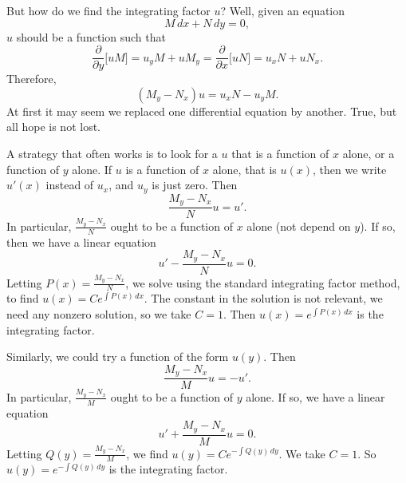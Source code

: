 But how do we find the integrating factor $u$?  Well, given an equation
\begin{equation*}
M \, dx + N \, dy = 0 ,
\end{equation*}
$u$ should be a
function such that
\begin{equation*}
\frac{\partial}{\partial y} \bigl[ u M \bigr] = 
u_y M + u M_y = 
\frac{\partial}{\partial x} \bigl[ u N \bigr] = 
u_x N + u N_x .
\end{equation*}
Therefore,
\begin{equation*}
(M_y-N_x)u = u_x N - u_y M .
\end{equation*}
At first it may seem we replaced one differential equation by another.
True, but all hope is not lost.

A strategy that often works is to look for a $u$ that is a function
of $x$ alone, or a function of $y$ alone.  If $u$ is a function of $x$
alone,
that is $u(x)$, then we write $u'(x)$ instead of $u_x$, and $u_y$ is just
zero.
Then
\begin{equation*}
\frac{M_y-N_x}{N}u = u' .
\end{equation*}
In particular, $\frac{M_y-N_x}{N}$ ought to be a function of $x$ alone (not
depend on $y$).  If so, then we have a linear equation
\begin{equation*}
u' - \frac{M_y-N_x}{N} u = 0 .
\end{equation*}
Letting $P(x) = \frac{M_y-N_x}{N}$,
we solve using the standard integrating factor method,
to find $u(x) = C e^{\int P(x) \, dx}$.  The constant in the
solution is not relevant, we need any nonzero solution,
so we take $C=1$.
Then $u(x) = e^{\int P(x) \, dx}$ is the integrating factor.

Similarly, we could try a function of the form $u(y)$.
Then
\begin{equation*}
\frac{M_y-N_x}{M} u = - u' .
\end{equation*}
In particular, $\frac{M_y-N_x}{M}$ ought to be a function of $y$ alone.
If so, we have a linear equation
\begin{equation*}
u' + \frac{M_y-N_x}{M} u = 0 .
\end{equation*}
Letting $Q(y) = \frac{M_y-N_x}{M}$,
we find $u(y) = C e^{-\int Q(y) \, dy}$.  We
take $C=1$.  So $u(y) = e^{-\int Q(y) \, dy}$ is the integrating factor.

